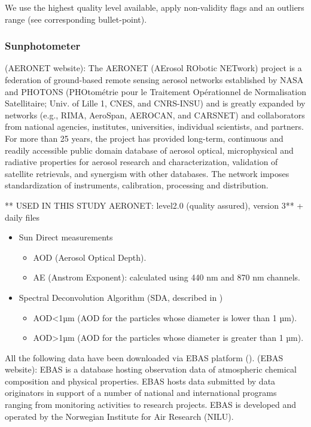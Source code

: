 \documentclass[journal abbreviation, manuscript]{copernicus}
\begin{document}
We use the highest quality level available, apply non-validity flags and an outliers range (see corresponding bullet-point).

\subsubsection{Sunphotometer}
(AERONET website): The AERONET (AErosol RObotic NETwork) project is a federation of ground-based remote sensing aerosol networks established by NASA and PHOTONS (PHOtométrie pour le Traitement Opérationnel de Normalisation Satellitaire; Univ. of Lille 1, CNES, and CNRS-INSU) and is greatly expanded by networks (e.g., RIMA, AeroSpan, AEROCAN, and CARSNET) and collaborators from national agencies, institutes, universities, individual scientists, and partners. For more than 25 years, the project has provided long-term, continuous and readily accessible public domain database of aerosol optical, microphysical and radiative properties for aerosol research and characterization, validation of satellite retrievals, and synergism with other databases. The network imposes standardization of instruments, calibration, processing and distribution.


** USED IN THIS STUDY AERONET: level2.0 (quality assured), version 3** + daily files

\begin{itemize}
    \item Sun Direct measurements
    \begin{itemize}
        \item AOD (Aerosol Optical Depth). 
        \item AE (Anstrom Exponent): calculated using 440 nm and 870 nm channels.
    \end{itemize}
    \item Spectral Deconvolution Algorithm (SDA, described in \cite{o2003spectral})
    \begin{itemize}
         \item AOD<1µm (AOD for the particles whose diameter is lower than 1 µm).
         \item AOD>1µm (AOD for the particles whose diameter is greater than 1 µm).
    \end{itemize}
\end{itemize}


All the following data have been downloaded via EBAS platform (\cite{ebasweb}).
(EBAS website): EBAS is a database hosting observation data of atmospheric chemical composition and physical properties. EBAS hosts data submitted by data originators in support of a number of national and international programs ranging from monitoring activities to research projects. EBAS is developed and operated by the Norwegian Institute for Air Research (NILU).
\end{document}

